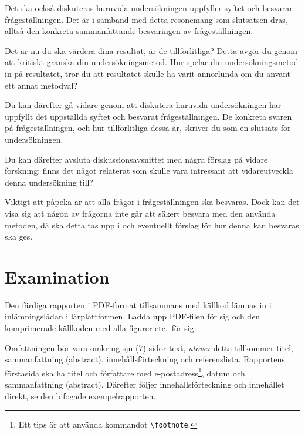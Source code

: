 \documentclass[a4paper]{miunasgn}
\begin{document}
Det ska också diskuteras huruvida undersökningen uppfyller syftet och besvarar 
frågeställningen.
Det är i samband med detta resonemang som slutsatsen dras, alltså den konkreta 
sammanfattande besvaringen av frågeställningen.

Det är nu du ska värdera dina resultat, är de tillförlitliga?
Detta avgör du genom att kritiskt granska din undersökningsmetod.
Hur spelar din undersökningsmetod in på resultatet, tror du att resultatet 
skulle ha varit annorlunda om du använt ett annat metodval?

Du kan därefter gå vidare genom att diskutera huruvida undersökningen har 
uppfyllt det uppställda syftet och besvarat frågeställningen.
De konkreta svaren på frågeställningen, och hur tillförlitliga dessa är, 
skriver du som en slutsats för undersökningen.

Du kan därefter avsluta diskussionsavsnittet med några förslag på vidare 
forskning: finns det något relaterat som skulle vara intressant att 
vidareutveckla denna undersökning till?

Viktigt att påpeka är att alla frågor i frågeställningen ska besvaras.
Dock kan det visa sig att någon av frågorna inte går att säkert besvara med den 
använda metoden, då ska detta tas upp i och eventuellt förslag för hur denna 
kan besvaras ska ges.


\section{Examination}

Den färdiga rapporten i PDF-format tillsammans med källkod lämnas in 
i inlämningslådan i lärplattformen.
Ladda upp PDF-filen för sig och den komprimerade källkoden med alla figurer 
etc.\ för sig.

Omfattningen bör vara omkring sju (7) sidor text, \emph{utöver} detta 
tillkommer titel, sammanfattning (abstract), innehållsförteckning och 
referenslista.
Rapportens förstasida ska ha titel och författare med e-postadress\footnote{%
  Ett tips är att använda kommandot \texttt{\textbackslash footnote}.
}, datum och sammanfattning (abstract).
Därefter följer innehållsförteckning och innehållet direkt, se den bifogade 
exempelrapporten.
\end{document}
